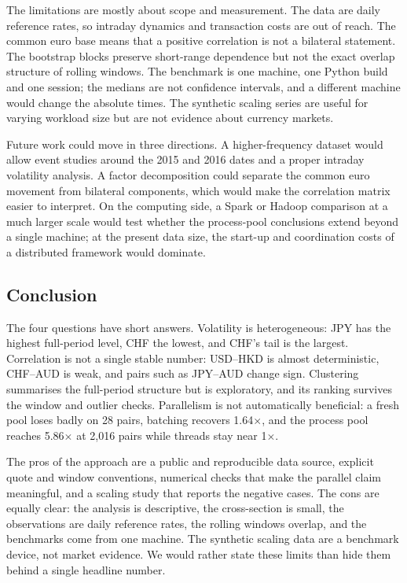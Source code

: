 \documentclass[journal]{IEEEtran}
\begin{document}
The limitations are mostly about scope and measurement. The data are daily reference rates, so intraday dynamics and transaction costs are out of reach. The common euro base means that a positive correlation is not a bilateral statement. The bootstrap blocks preserve short-range dependence but not the exact overlap structure of rolling windows. The benchmark is one machine, one Python build and one session; the medians are not confidence intervals, and a different machine would change the absolute times. The synthetic scaling series are useful for varying workload size but are not evidence about currency markets.

Future work could move in three directions. A higher-frequency dataset would allow event studies around the 2015 and 2016 dates and a proper intraday volatility analysis. A factor decomposition could separate the common euro movement from bilateral components, which would make the correlation matrix easier to interpret. On the computing side, a Spark or Hadoop comparison at a much larger scale would test whether the process-pool conclusions extend beyond a single machine; at the present data size, the start-up and coordination costs of a distributed framework would dominate.

\subsection{Conclusion}
The four questions have short answers. Volatility is heterogeneous: JPY has the highest full-period level, CHF the lowest, and CHF's tail is the largest. Correlation is not a single stable number: USD--HKD is almost deterministic, CHF--AUD is weak, and pairs such as JPY--AUD change sign. Clustering summarises the full-period structure but is exploratory, and its ranking survives the window and outlier checks. Parallelism is not automatically beneficial: a fresh pool loses badly on 28 pairs, batching recovers 1.64$\times$, and the process pool reaches 5.86$\times$ at 2,016 pairs while threads stay near 1$\times$.

The pros of the approach are a public and reproducible data source, explicit quote and window conventions, numerical checks that make the parallel claim meaningful, and a scaling study that reports the negative cases. The cons are equally clear: the analysis is descriptive, the cross-section is small, the observations are daily reference rates, the rolling windows overlap, and the benchmarks come from one machine. The synthetic scaling data are a benchmark device, not market evidence. We would rather state these limits than hide them behind a single headline number.
\end{document}
